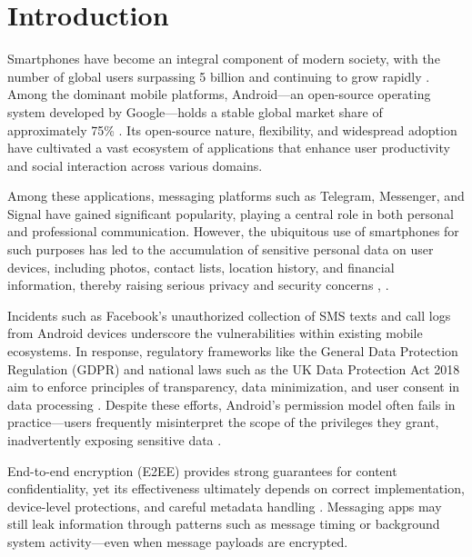 \documentclass[a4paper,12pt]{report}
\begin{document}
\chapter{Introduction}

Smartphones have become an integral component of modern society, with the number
of global users surpassing 5 billion and continuing to grow rapidly
\cite{DataReportal2025}. Among the dominant mobile platforms, Android—an
open-source operating system developed by Google—holds a stable global market
share of approximately 75\% \cite{StatCounter2025}. Its open-source nature,
flexibility, and widespread adoption have cultivated a vast ecosystem of
applications that enhance user productivity and social interaction across
various domains.

Among these applications, messaging platforms such as Telegram, Messenger, and Signal have gained significant popularity, playing a
central role in both personal and professional communication. However, the
ubiquitous use of smartphones for such purposes has led to the accumulation of
sensitive personal data on user devices, including photos, contact lists,
location history, and financial information, thereby raising serious privacy and
security concerns \cite{ArsTechnica2018}, \cite{ShenVervierStringhini2021}.

Incidents such as Facebook’s unauthorized collection of SMS texts and call logs
from Android devices \cite{ArsTechnica2018} underscore the vulnerabilities
within existing mobile ecosystems. In response, regulatory frameworks like the
General Data Protection Regulation (GDPR) and national laws such as the UK Data
Protection Act 2018 aim to enforce principles of transparency, data
minimization, and user consent in data processing
\cite{GDPR2016,UKDPA2018}. Despite these efforts, Android’s permission model
often fails in practice—users frequently misinterpret the scope of the
privileges they grant, inadvertently exposing sensitive data \cite{CHI2024Permissions}.

End-to-end encryption (E2EE) provides strong guarantees for content
confidentiality, yet its effectiveness ultimately depends on correct
implementation, device-level protections, and careful metadata handling
\cite{arxiv2020metadata,CohnGordon2017SignalAnalysis,wired2023signalhack}. Messaging apps may still leak
information through patterns such as message timing or background system
activity—even when message payloads are encrypted.
\end{document}
